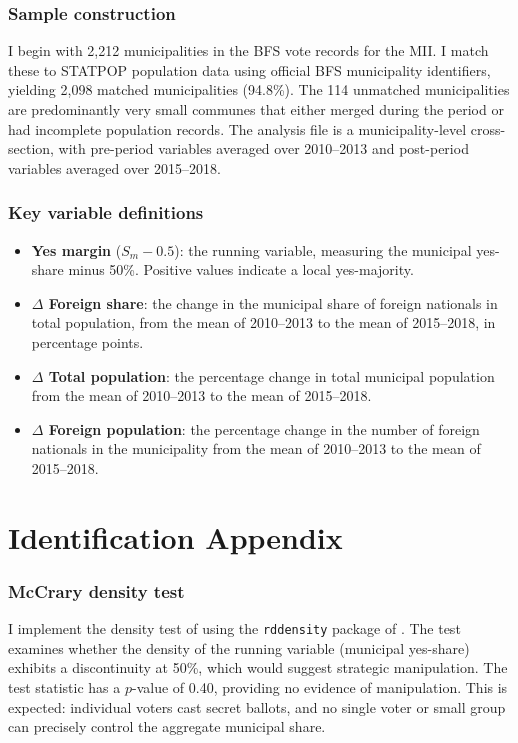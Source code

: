 \documentclass[12pt]{article}
\begin{document}
\subsubsection*{Sample construction} I begin with 2,212 municipalities in the BFS vote records for the MII. I match these to STATPOP population data using official BFS municipality identifiers, yielding 2,098 matched municipalities (94.8\%). The 114 unmatched municipalities are predominantly very small communes that either merged during the period or had incomplete population records. The analysis file is a municipality-level cross-section, with pre-period variables averaged over 2010--2013 and post-period variables averaged over 2015--2018.

\subsubsection*{Key variable definitions}
\begin{itemize}
\item \textbf{Yes margin} ($S_m - 0.5$): the running variable, measuring the municipal yes-share minus 50\%. Positive values indicate a local yes-majority.
\item \textbf{$\Delta$ Foreign share}: the change in the municipal share of foreign nationals in total population, from the mean of 2010--2013 to the mean of 2015--2018, in percentage points.
\item \textbf{$\Delta$ Total population}: the percentage change in total municipal population from the mean of 2010--2013 to the mean of 2015--2018.
\item \textbf{$\Delta$ Foreign population}: the percentage change in the number of foreign nationals in the municipality from the mean of 2010--2013 to the mean of 2015--2018.
\end{itemize}


\section{Identification Appendix}
\label{sec:id_appendix}

\subsubsection*{McCrary density test} I implement the density test of \citet{mccrary2008} using the \texttt{rddensity} package of \citet{cattaneo2020inference}. The test examines whether the density of the running variable (municipal yes-share) exhibits a discontinuity at 50\%, which would suggest strategic manipulation. The test statistic has a $p$-value of 0.40, providing no evidence of manipulation. This is expected: individual voters cast secret ballots, and no single voter or small group can precisely control the aggregate municipal share.
\end{document}
